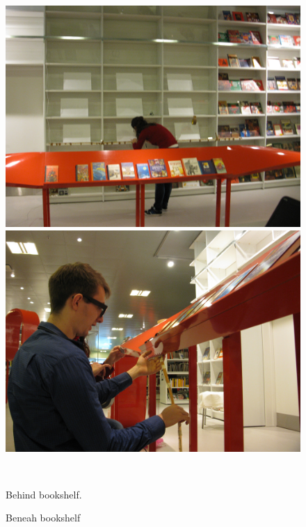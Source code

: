 \begin{figure}[htbp] \centering
\begin{minipage}[b]{0.45\textwidth} \centering
\includegraphics[width=1.00\textwidth]{Pictures/Design/behindShelf} %
\end{minipage} \hfill
\begin{minipage}[b]{0.45\textwidth} \centering
\includegraphics[width=1.00\textwidth]{Pictures/Design/frontShelf} %
\end{minipage} \\ %
\begin{minipage}[t]{0.45\textwidth}
\caption{Behind bookshelf.} %
\label{fig:behindShelf}
\end{minipage} \hfill
\begin{minipage}[t]{0.45\textwidth}
\caption{Beneah bookshelf} %
\label{fig:frontShelf}
\end{minipage}
\end{figure}
